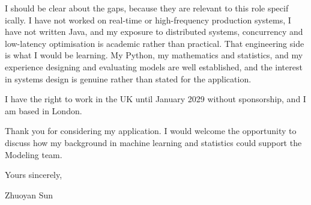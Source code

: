 \documentclass[letterpaper,11pt]{article}
\begin{document}
I should be clear about the gaps, because they are relevant to this role specif\kern0pt ically. I have not worked on real-time or high-frequency production systems, I have not written Java, and my exposure to distributed systems, concurrency and low-latency optimisation is academic rather than practical. That engineering side is what I would be learning. My Python, my mathematics and statistics, and my experience designing and evaluating models are well established, and the interest in systems design is genuine rather than stated for the application.

I have the right to work in the UK until January 2029 without sponsorship, and I am based in London.

Thank you for considering my application. I would welcome the opportunity to discuss how my background in machine learning and statistics could support the Modeling team.

\vspace{2pt}
Yours sincerely,

\vspace{8pt}
Zhuoyan Sun
\end{document}
